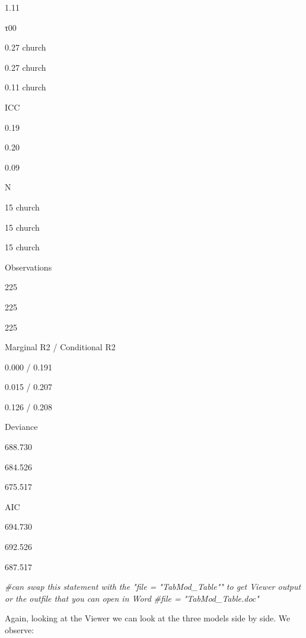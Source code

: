 \documentclass[
  english,
]{book}
\newenvironment{Shaded}{\begin{snugshade}}{\end{snugshade}}
\newcommand{\CommentTok}[1]{\textcolor[rgb]{0.56,0.35,0.01}{\textit{#1}}}
\begin{document}
1.11

τ00

0.27 church

0.27 church

0.11 church

ICC

0.19

0.20

0.09

N

15 church

15 church

15 church

Observations

225

225

225

Marginal R2 / Conditional R2

0.000 / 0.191

0.015 / 0.207

0.126 / 0.208

Deviance

688.730

684.526

675.517

AIC

694.730

692.526

687.517

\begin{Shaded}
\begin{Highlighting}[]
\CommentTok{\#can swap this statement with the "file = "TabMod\_Table"" to get Viewer output or the outfile that you can open in Word}
\CommentTok{\#file = "TabMod\_Table.doc"}
\end{Highlighting}
\end{Shaded}

Again, looking at the Viewer we can look at the three models side by side. We observe:
\end{document}

